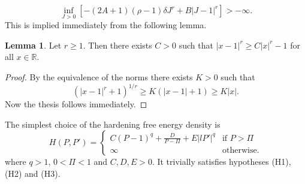 \documentclass[a4paper,10pt,oneside]{amsbook}
\numberwithin{section}{chapter}
\numberwithin{equation}{chapter}
\theoremstyle{definition}
\newtheorem{lemma}[prop]{Lemma}
\begin{document}
\[
\inf_{J>0}\left[-(2A+1)(\rho-1)\delta J^r+B|J-1|^r\right]>-\infty.
\]
This is implied immediately from the following lemma.
\begin{lemma}
Let $r\ge1$. Then there exists $C>0$ such that $|x-1|^r\ge C|x|^r-1$ for all $x\in\mathbb{R}$.
\end{lemma}
\begin{proof}
By the equivalence of the norms there exists $K>0$ such that
\[
(|x-1|^r+1)^{1/r}\ge K(|x-1|+1)\ge K|x|.
\]
Now the thesis follows immediately.
\end{proof}
The simplest choice of the hardening free energy density is
\[
H(P,P')=
\begin{cases}
C(P-1)^q+\frac{D}{P-\Pi}+E|lP'|^q & \text{if $P>\Pi$} \\
\infty & \text{otherwise}.
\end{cases}
\]
where $q>1$, $0<\Pi<1$ and $C,D,E>0$. It trivially satisfies hypotheses (H1), (H2) and (H3).
\end{document}
